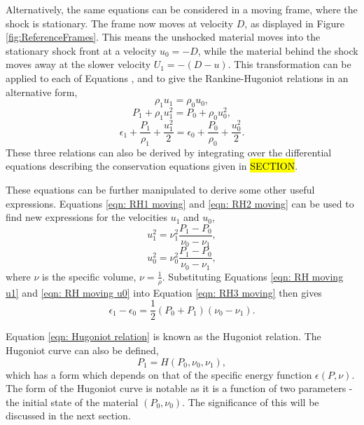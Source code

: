 Alternatively, the same equations can be considered in a moving frame, where the shock is stationary. The frame now moves at velocity $D$, as displayed in Figure \ref{fig:ReferenceFrames}. This means the unshocked material moves into the stationary shock front at a velocity $u_0 = -D$, while the material behind the shock moves away at the slower velocity $U_1 = -(D - u)$. This transformation can be applied to each of Equations \label{eqn: RH1 stationary}, \label{eqn: RH2 stationary} and \label{eqn: RH3 stationary} to give the Rankine-Hugoniot relations in an alternative form,
\begin{equation} \rho_1 u_1 = \rho_0 u_0, \label{eqn: RH1 moving} \end{equation}
\begin{equation} P_1 + \rho_1 u_1^2 = P_0 + \rho_0 u_0^2, \label{eqn: RH2 moving} \end{equation}
\begin{equation} \epsilon_1 + \frac{P_1}{\rho_1} + \frac{u_1^2}{2} = \epsilon_0 + \frac{P_0}{\rho_0} + \frac{u_0^2}{2}. \label{eqn: RH3 moving} \end{equation}
These three relations can also be derived by integrating over the differential equations describing the conservation equations given in \hl{SECTION}.

These equations can be further manipulated to derive some other useful expressions. Equations \ref{eqn: RH1 moving} and \ref{eqn: RH2 moving} can be used to find new expressions for the velocities $u_1$ and $u_0$, 
\begin{equation} u_1^2 = \nu_1^2 \frac{P_1 - P_0}{\nu_0 - \nu_1}, \label{eqn: RH moving u1} \end{equation}
\begin{equation} u_0^2 = \nu_0^2 \frac{P_1 - P_0}{\nu_0 - \nu_1}, \label{eqn: RH moving u0} \end{equation}
where $\nu$ is the specific volume, $\nu = \frac{1}{\rho}$. Substituting Equations \ref{eqn: RH moving u1} and \ref{eqn: RH moving u0} into Equation \ref{eqn: RH3 moving} then gives
\begin{equation} \epsilon_1 - \epsilon_0 = \frac{1}{2}(P_0 + P_1)(\nu_0 - \nu_1).\label{eqn: Hugoniot relation} \end{equation}

Equation \ref{eqn: Hugoniot relation} is known as the Hugoniot relation. The Hugoniot curve can also be defined, 
\begin{equation} P_1 = H(P_0, \nu_0, \nu_1),\label{eqn: Hugoniot relation} \end{equation}
which has a form which depends on that of the specific energy function $\epsilon(P, \nu)$. The form of the Hugoniot curve is notable as it is a function of two parameters - the initial state of the material $(P_0, \nu_0)$. The significance of this will be discussed in the next section.

